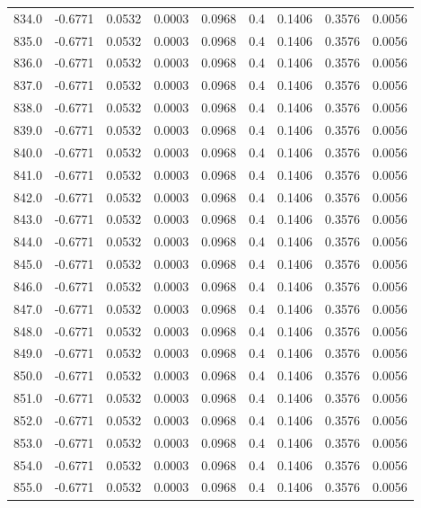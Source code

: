 \begin{longtable}{lrrrrrrrr}
834.0 & -0.6771 & 0.0532 & 0.0003 & 0.0968 & 0.4 & 0.1406 & 0.3576 & 0.0056 \\
835.0 & -0.6771 & 0.0532 & 0.0003 & 0.0968 & 0.4 & 0.1406 & 0.3576 & 0.0056 \\
836.0 & -0.6771 & 0.0532 & 0.0003 & 0.0968 & 0.4 & 0.1406 & 0.3576 & 0.0056 \\
837.0 & -0.6771 & 0.0532 & 0.0003 & 0.0968 & 0.4 & 0.1406 & 0.3576 & 0.0056 \\
838.0 & -0.6771 & 0.0532 & 0.0003 & 0.0968 & 0.4 & 0.1406 & 0.3576 & 0.0056 \\
839.0 & -0.6771 & 0.0532 & 0.0003 & 0.0968 & 0.4 & 0.1406 & 0.3576 & 0.0056 \\
840.0 & -0.6771 & 0.0532 & 0.0003 & 0.0968 & 0.4 & 0.1406 & 0.3576 & 0.0056 \\
841.0 & -0.6771 & 0.0532 & 0.0003 & 0.0968 & 0.4 & 0.1406 & 0.3576 & 0.0056 \\
842.0 & -0.6771 & 0.0532 & 0.0003 & 0.0968 & 0.4 & 0.1406 & 0.3576 & 0.0056 \\
843.0 & -0.6771 & 0.0532 & 0.0003 & 0.0968 & 0.4 & 0.1406 & 0.3576 & 0.0056 \\
844.0 & -0.6771 & 0.0532 & 0.0003 & 0.0968 & 0.4 & 0.1406 & 0.3576 & 0.0056 \\
845.0 & -0.6771 & 0.0532 & 0.0003 & 0.0968 & 0.4 & 0.1406 & 0.3576 & 0.0056 \\
846.0 & -0.6771 & 0.0532 & 0.0003 & 0.0968 & 0.4 & 0.1406 & 0.3576 & 0.0056 \\
847.0 & -0.6771 & 0.0532 & 0.0003 & 0.0968 & 0.4 & 0.1406 & 0.3576 & 0.0056 \\
848.0 & -0.6771 & 0.0532 & 0.0003 & 0.0968 & 0.4 & 0.1406 & 0.3576 & 0.0056 \\
849.0 & -0.6771 & 0.0532 & 0.0003 & 0.0968 & 0.4 & 0.1406 & 0.3576 & 0.0056 \\
850.0 & -0.6771 & 0.0532 & 0.0003 & 0.0968 & 0.4 & 0.1406 & 0.3576 & 0.0056 \\
851.0 & -0.6771 & 0.0532 & 0.0003 & 0.0968 & 0.4 & 0.1406 & 0.3576 & 0.0056 \\
852.0 & -0.6771 & 0.0532 & 0.0003 & 0.0968 & 0.4 & 0.1406 & 0.3576 & 0.0056 \\
853.0 & -0.6771 & 0.0532 & 0.0003 & 0.0968 & 0.4 & 0.1406 & 0.3576 & 0.0056 \\
854.0 & -0.6771 & 0.0532 & 0.0003 & 0.0968 & 0.4 & 0.1406 & 0.3576 & 0.0056 \\
855.0 & -0.6771 & 0.0532 & 0.0003 & 0.0968 & 0.4 & 0.1406 & 0.3576 & 0.0056 \\

\end{longtable}

